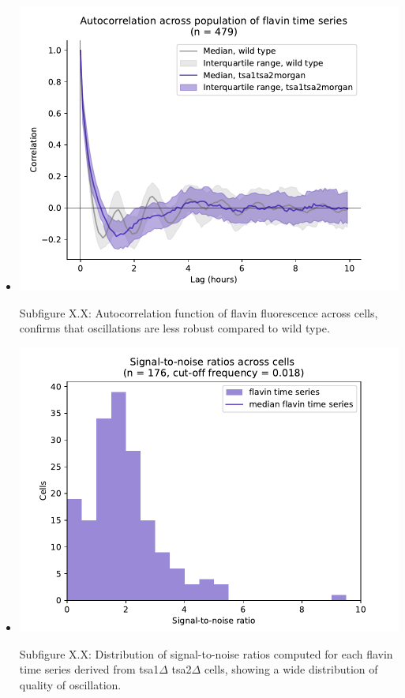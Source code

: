 \begin{itemize}
\begin{itemize}
\item \begin{center}
\includegraphics[width=.9\linewidth]{tsa1tsa2morgan_1253_plots_11.pdf}
\end{center} Subfigure X.X: Autocorrelation function of flavin fluorescence across cells, confirms that oscillations are less robust compared to wild type.
\item \begin{center}
\includegraphics[width=.9\linewidth]{tsa1tsa2morgan_1253_plots_10.pdf}
\end{center} Subfigure X.X: Distribution of signal-to-noise ratios computed for each flavin time series derived from tsa1\(\Delta\) tsa2\(\Delta\) cells, showing a wide distribution of quality of oscillation.
\end{itemize}
\end{itemize}


